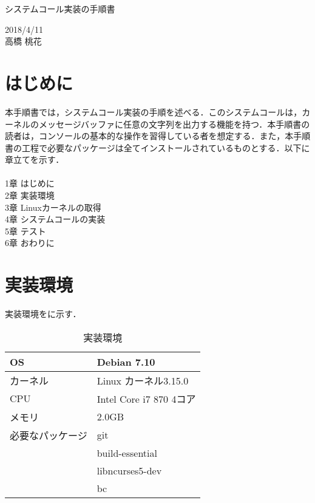\documentclass[12pt]{jsarticle}
\begin{document}
\begin{center}
{\LARGE システムコール実装の手順書}
\end{center}

\begin{flushright}
  2018/4/11\\
  高橋 桃花
\end{flushright}
\section{はじめに}
\label{sec:introduction}
本手順書では，システムコール実装の手順を述べる．このシステムコールは，カーネルのメッセージバッファに任意の文字列を出力する機能を持つ．本手順書の読者は，コンソールの基本的な操作を習得している者を想定する．また，本手順書の工程で必要なパッケージは全てインストールされているものとする．以下に章立てを示す． \\ \\
1章 はじめに \\
2章 実装環境 \\
3章 Linuxカーネルの取得 \\
4章 システムコールの実装 \\
5章 テスト \\
6章 おわりに \\

\section{実装環境}
\label{sec:devenv}
実装環境をに示す．

\begin{table}[h]
  \begin{center}
    \caption{実装環境}\label{tab:devenv_table}
    \begin{tabular}{l|l}
      \hline \hline
      OS & Debian 7.10 \\ \hline
      カーネル & Linux カーネル3.15.0 \\ \hline
      CPU & Intel Core i7 870 4コア\\ \hline
      メモリ & 2.0GB \\ \hline
      必要なパッケージ & git \\ 
      & build-essential \\ 
      & libncurses5-dev \\ 
      & bc \\ \hline
      
    \end{tabular}
  \end{center}
\end{table}
\end{document}
